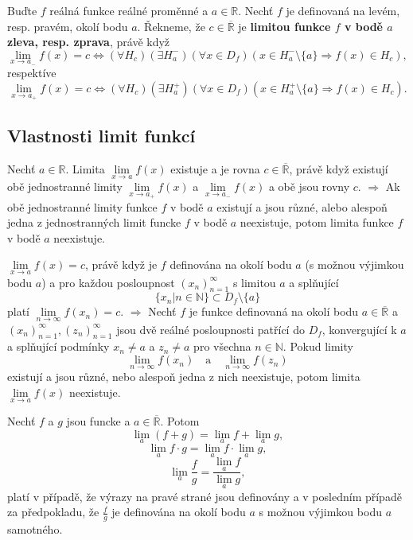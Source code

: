  Buďte $f$ reálná funkce reálné proměnné a $a \in\mathbb {R}$. Nechť $f$ je definovaná na levém, resp. pravém, okolí bodu $a$. Řekneme, že $c \in\overline{\mathbb{R}}$ je \textbf{limitou funkce $f$ v bodě $a$ zleva, resp. zprava}, právě když
$$
	\lim_{x\rightarrow a_-}f(x)=c \Leftrightarrow (\forall H_c)(\exists H_a^{-})(\forall x \in D_f)(x \in H_a^{-} \setminus \{a\} \Rightarrow f(x) \in H_c),
$$
respektíve
$$
	\lim_{x\rightarrow a_+}f(x)=c \Leftrightarrow (\forall H_c)(\exists H_a^{+})(\forall x \in D_f)(x \in H_a^{+} \setminus \{a\} \Rightarrow f(x) \in H_c).
$$

\subsection{Vlastnosti limit funkcí}
\theorem Nechť $a\in\mathbb{R}$. Limita $\lim\limits_{x\rightarrow a}f(x)$ existuje a je rovna $c\in\overline{\mathbb{R}}$, právě když existují obě jednostranné limity $\lim\limits_{x\rightarrow a_+}f(x)$ a $\lim\limits_{x\rightarrow a_-}f(x)$ a obě jsou rovny $c$. \hspace{.5cm}$\Rightarrow$\hspace{.5cm} Ak obě jednostranné limity funkce $f$ v bodě $a$ existují a jsou různé, alebo alespoň jedna z jednostranných limit funcke $f$ v bodě $a$ neexistuje, potom limita funkce $f$ v bodě $a$ neexistuje.

\theorem[Heine]\label{th:heine} $\lim\limits_{x\rightarrow a} f(x)=c$, právě když je $f$ definována na okolí bodu $a$ (s možnou výjimkou bodu $a$) a pro každou posloupnost $(x_n)_{n=1}^\infty$ s limitou $a$ a splňující
$$
	\{x_n|n\in\mathbb{N}\}\subset D_f\setminus\{a\}
$$
platí $\lim\limits_{n\rightarrow\infty} f(x_n)=c$. \hspace{.5cm}$\Rightarrow$\hspace{.5cm} Nechť $f$ je funkce definovaná na okolí bodu $a\in\overline{\mathbb{R}}$ a $(x_n)_{n=1}^{\infty},(z_n)_{n=1}^{\infty}$ jsou dvě reálné posloupnosti patřící do $D_f$, konvergující k $a$ a splňující podmínky $x_n\neq a$ a $z_n\neq a$ pro všechna $n\in\mathbb{N}$. Pokud limity
$$
	\lim_{n\rightarrow\infty}f(x_n)\quad\mathrm{a}\quad\lim_{n\rightarrow\infty}f(z_n)
$$
existují a jsou různé, nebo alespoň jedna z nich neexistuje, potom limita $\lim\limits_{x\rightarrow a}f(x)$ neexistuje.

\theorem Nechť $f$ a $g$ jsou funcke a $a\in\overline{\mathbb{R}}$. Potom
$$
	\lim_a (f+g)=\lim_a f + \lim_a g,
$$
$$
	\lim_a f\cdot g=\lim_a f \cdot \lim_a g,
$$
$$
	\lim_a \frac{f}{g}=\frac{\lim_a f}{\lim_a g},
$$
platí v případě, že výrazy na pravé strané jsou definovány a v posledním případě za předpokladu, že $\frac{f}{g}$ je definována na okolí bodu $a$ s možnou výjimkou bodu $a$ samotného.

